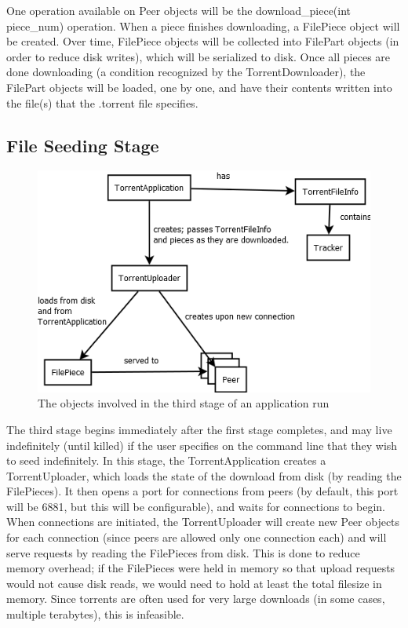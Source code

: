 \documentclass[letter]{scrartcl}
\begin{document}
One operation available on Peer objects will be the download\_piece(int piece\_num) operation.  When a piece finishes downloading, a FilePiece object will be created.  Over time, FilePiece objects will be collected into FilePart objects (in order to reduce disk writes), which will be serialized to disk.  Once all pieces are done downloading (a condition recognized by the TorrentDownloader), the FilePart objects will be loaded, one by one, and have their contents written into the file(s) that the .torrent file specifies.

\subsection{File Seeding Stage}
\begin{figure}[h]
\centering
\includegraphics[scale=.5]{StepThree.png}
\caption{The objects involved in the third stage of an application run}
\end{figure}

The third stage begins immediately after the first stage completes, and may live indefinitely (until killed) if the user specifies on the command line that they wish to seed indefinitely.  In this stage, the TorrentApplication creates a TorrentUploader, which loads the state of the download from disk (by reading the FilePieces).  It then opens a port for connections from peers (by default, this port will be 6881, but this will be configurable), and waits for connections to begin.  When connections are initiated, the TorrentUploader will create new Peer objects for each connection (since peers are allowed only one connection each) and will serve requests by reading the FilePieces from disk.  This is done to reduce memory overhead; if the FilePieces were held in memory so that upload requests would not cause disk reads, we would need to hold at least the total filesize in memory.  Since torrents are often used for very large downloads (in some cases, multiple terabytes), this is infeasible.
\end{document}
